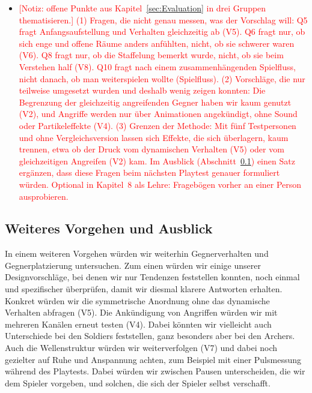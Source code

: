 \documentclass[../Main.tex]{subfiles}
\begin{document}
\begin{itemize}[leftmargin=1.5cm]
    \item \textcolor{red}{[Notiz: offene Punkte aus Kapitel~\ref{sec:Evaluation} in drei Gruppen thematisieren.] (1) Fragen, die nicht genau messen, was der Vorschlag will: Q5 fragt Anfangsaufstellung und Verhalten gleichzeitig ab (V5). Q6 fragt nur, ob sich enge und offene Räume anders anfühlten, nicht, ob sie schwerer waren (V6). Q8 fragt nur, ob die Staffelung bemerkt wurde, nicht, ob sie beim Verstehen half (V8). Q10 fragt nach einem zusammenhängenden Spielfluss, nicht danach, ob man weiterspielen wollte (Spielfluss). (2) Vorschläge, die nur teilweise umgesetzt wurden und deshalb wenig zeigen konnten: Die Begrenzung der gleichzeitig angreifenden Gegner haben wir kaum genutzt (V2), und Angriffe werden nur über Animationen angekündigt, ohne Sound oder Partikeleffekte (V4). (3) Grenzen der Methode: Mit fünf Testpersonen und ohne Vergleichsversion lassen sich Effekte, die sich überlagern, kaum trennen, etwa ob der Druck vom dynamischen Verhalten (V5) oder vom gleichzeitigen Angreifen (V2) kam. Im Ausblick (Abschnitt~\ref{sec:Verbesserungen}) einen Satz ergänzen, dass diese Fragen beim nächsten Playtest genauer formuliert würden. Optional in Kapitel~8 als Lehre: Fragebögen vorher an einer Person ausprobieren.}
\end{itemize}

\subsection{Weiteres Vorgehen und Ausblick} \label{sec:Verbesserungen}

In einem weiteren Vorgehen würden wir weiterhin Gegnerverhalten und Gegnerplatzierung untersuchen. Zum einen würden wir einige unserer Designvorschläge, bei denen wir nur Tendenzen feststellen konnten, noch einmal und spezifischer überprüfen, damit wir diesmal klarere Antworten erhalten. Konkret würden wir die symmetrische Anordnung ohne das dynamische Verhalten abfragen (V5). Die Ankündigung von Angriffen würden wir mit mehreren Kanälen erneut testen (V4). Dabei könnten wir vielleicht auch Unterschiede bei den Soldiers feststellen, ganz besonders aber bei den Archers. Auch die Wellenstruktur würden wir weiterverfolgen (V7) und dabei noch gezielter auf Ruhe und Anspannung achten, zum Beispiel mit einer Pulsmessung während des Playtests.\autocite[285--287]{drachen2018gamesuserresearch} Dabei würden wir zwischen Pausen unterscheiden, die wir dem Spieler vorgeben, und solchen, die sich der Spieler selbst verschafft.
\end{document}
